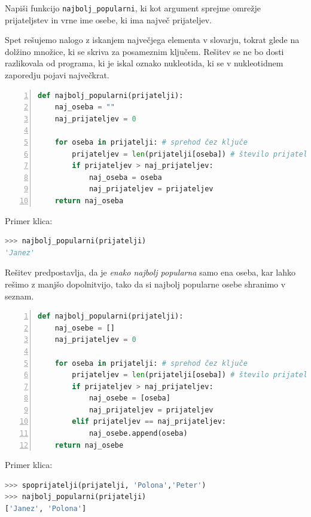 \begin{zgled}
Napiši funkcijo \texttt{najbolj\_popularni}, ki kot argument sprejme omrežje prijateljstev in vrne ime osebe, ki ima največ prijateljev.
\end{zgled}
\begin{resitev}
Spet rešujemo nalogo z iskanjem največjega elementa v slovarju, tokrat glede na dolžino množice, ki se skriva za posameznim ključem. Rešitev se ne bo dosti razlikovala od programa, ki je iskal oznako nukleotida, ki se v nukleotidnem zaporedju pojavi največkrat.
\begin{lstlisting}[language=Python, showstringspaces=false,numbers=left]
def najbolj_popularni(prijatelji):
    naj_oseba = ""
    naj_prijateljev = 0
    
    for oseba in prijatelji: # sprehod čez ključe
        prijateljev = len(prijatelji[oseba]) # število prijateljev
        if prijateljev > naj_prijateljev:
            naj_oseba = oseba
            naj_prijateljev = prijateljev
    return naj_oseba
\end{lstlisting}
Primer klica:
\begin{lstlisting}[language=Python, showstringspaces=false]
>>> najbolj_popularni(prijatelji)
'Janez'
\end{lstlisting}

Rešitev predpostavlja, da je \emph{enako najbolj popularna} samo ena oseba, kar lahko rešimo z manjšo dopolnitvijo, tako da si najbolj popularne osebe shranimo v seznam. 
\begin{lstlisting}[language=Python, showstringspaces=false,numbers=left]
def najbolj_popularni(prijatelji):
    naj_osebe = []
    naj_prijateljev = 0
    
    for oseba in prijatelji: # sprehod čez ključe
        prijateljev = len(prijatelji[oseba]) # število prijateljev
        if prijateljev > naj_prijateljev:
            naj_osebe = [oseba]
            naj_prijateljev = prijateljev
        elif prijateljev == naj_prijateljev:
            naj_osebe.append(oseba)
    return naj_osebe
\end{lstlisting}
Primer klica:
\begin{lstlisting}[language=Python, showstringspaces=false]
>>> spoprijatelji(prijatelji, 'Polona','Peter')
>>> najbolj_popularni(prijatelji)
['Janez', 'Polona']
\end{lstlisting}
\end{resitev}

